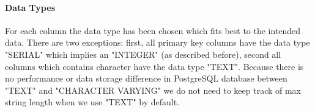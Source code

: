 \paragraph{Data Types}
For each column the data type has been chosen which fits best to the intended data. There are two exceptions: first, all primary key columns have the data type "SERIAL" which implies an "INTEGER" (as described before), second all columns which contains character have the data type "TEXT". Because there is no performance or data storage difference in PostgreSQL database between "TEXT" and "CHARACTER VARYING" we do not need to keep track of max string length when we use "TEXT" by default.